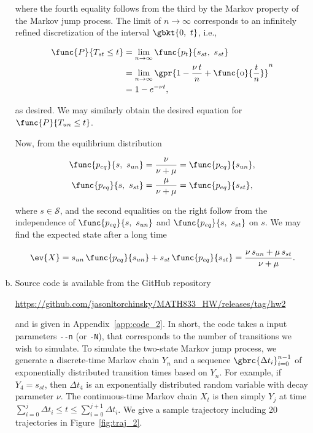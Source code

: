\begin{enumerate}[a)]
		where the fourth equality follows from the third by the Markov property of the Markov jump process. The limit of $n \to \infty$ corresponds to an infinitely refined discretization of the interval $\gbkt{0,\ t}$, i.e.,
		
		\begin{align}
			\func{P}{T_{st} \leq t} &= \lim_{n \to \infty} \func{p_{t}}{s_{st},\ s_{st}} \nonumber \\
				&= \lim_{n \to \infty} \gpr{1 - \frac{\nu\,t}{n} + \func{\text{o}}{\frac{t}{n}}}^n \nonumber \\
				&= 1 - e^{-\nu t},
		\end{align}
		
		as desired. We may similarly obtain the desired equation for $\func{P}{T_{un} \leq t}$.
		
		Now, from the equilibrium distribution 
		
		\begin{subequations}
			\begin{align}
				\func{p_{eq}}{s,\ s_{un}} &= \frac{\nu}{\nu + \mu} = \func{p_{eq}}{s_{un}}, \\
				\func{p_{eq}}{s,\ s_{st}} &= \frac{\mu}{\nu + \mu} = \func{p_{eq}}{s_{st}}, \\
			\end{align}
		\end{subequations}
		
		where $s \in \mathcal{S}$, and the second equalities on the right follow from the independence of $\func{p_{eq}}{s,\ s_{un}}$ and $\func{p_{eq}}{s,\ s_{st}}$ on $s$. We may find the expected state after a long time
		
		\begin{equation}
			\ev{X} = s_{un}\,\func{p_{eq}}{s_{un}} + s_{st}\,\func{p_{eq}}{s_{st}} = \frac{\nu\,s_{un} + \mu\,s_{st}}{\nu + \mu}.
		\end{equation}
		
	\item Source code is available from the GitHub repository
	
\begin{center}
	\url{https://github.com/jasonltorchinsky/MATH833_HW/releases/tag/hw2}
\end{center}

and is given in Appendix~\ref{app:code_2}. In short, the code takes a input parameters \texttt{-{}-n} (or \texttt{-N}), that corresponds to the number of transitions we wish to simulate. To simulate the two-state Markov jump process, we generate a discrete-time Markov chain $Y_n$ and a sequence $\gbrc{\Delta t_i}_{i = 0}^{n-1}$ of exponentially distributed transition times based on $Y_n$. For example, if $Y_4 = s_{st}$, then $\Delta t_4$ is an exponentially distributed random variable with decay parameter $\nu$. The continuous-time Markov chain $X_t$ is then simply $Y_j$ at time $\sum_{i = 0}^{j} \Delta t_i \leq t \leq \sum_{i = 0}^{j+1} \Delta t_i$. We give a sample trajectory including 20 trajectories in Figure~\ref{fig:traj_2}.


\end{enumerate}
